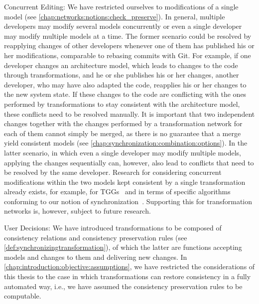 \begin{properdescription}
\item[Concurrent Editing:] 
We have restricted ourselves to modifications of a single model (see \autoref{chap:networks:notions:check_preserve}). 
In general, multiple developers may modify several models concurrently or even a single developer may modify multiple models at a time.
The former scenario could be resolved by reapplying changes of other developers whenever one of them has published his or her modifications, comparable to rebasing commits with Git.
For example, if one developer changes an architecture model, which leads to changes to the code through transformations, and he or she publishes his or her changes, another developer, who may have also adapted the code, reapplies his or her changes to the new system state.
If these changes to the code are conflicting with the ones performed by transformations to stay consistent with the architecture model, these conflicts need to be resolved manually.
It is important that two independent changes together with the changes performed by a transformation network for each of them cannot simply be merged, as there is no guarantee that a merge yield consistent models (see \autoref{chap:synchronization:combination:options}).
In the latter scenario, in which even a single developer may modify multiple models, applying the changes sequentially can, however, also lead to conflicts that need to be resolved by the same developer.
Research for considering concurrent modifications within the two models kept consistent by a single transformation already exists, for example, for \glspl{TGG}~\cite{hermann2012concurrentSynchronization-FASE,orejas2020IncrementalConcurrentSynchronization-FASE} and in terms of specific algorithms conforming to our notion of synchronization~\cite{xiong2013SynchronizingConcurrentUpdates-SoSym,xiong2009parallelUpdates-ICMT}.
Supporting this for transformation networks is, however, subject to future research.
\item[User Decisions:]
We have introduced transformations to be composed of consistency relations and consistency preservation rules (see \autoref{def:synchronizingtransformation}), of which the latter are functions accepting models and changes to them and delivering new changes.
In \autoref{chap:introduction:objective:assumptions}, we have restricted the considerations of this thesis to the case in which transformations can restore consistency in a fully automated way, i.e., we have assumed the consistency preservation rules to be computable.

\end{properdescription}
